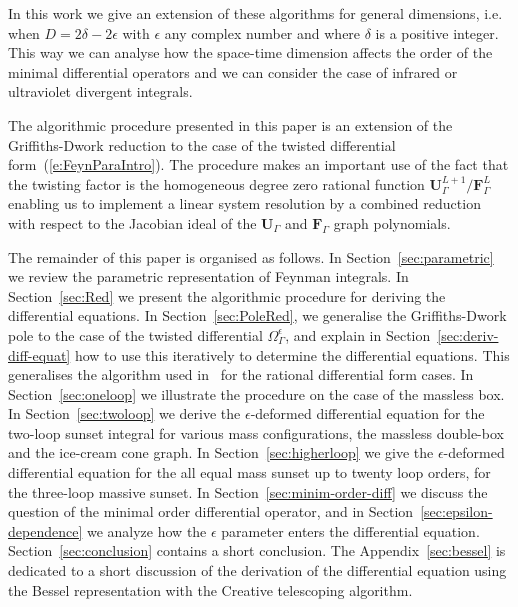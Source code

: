 \documentclass[a4paper,12pt]{article}
\newcommand\lNote[1]{
	\todo[backgroundcolor=red!20!white,fancyline,
	bordercolor=white]{ LDLC:  #1}}
\numberwithin{equation}{section}
\numberwithin{figure}{section}
\begin{document}
In this work we give an extension of these algorithms for
general dimensions, i.e. when $D=2 \delta -2\epsilon$ with $\epsilon$ any
complex number and where $\delta$ is a positive integer.  This way we
can analyse how the space-time dimension affects the order of the
minimal differential operators and we can consider the case of infrared
or ultraviolet divergent integrals.

The algorithmic procedure presented in this paper is an extension of
the Griffiths-Dwork reduction to the case of the twisted differential
form~(\ref{e:FeynParaIntro}).  The procedure makes an important use of
the fact that the twisting factor is the homogeneous degree zero
rational function $\textbf{U}_\Gamma^{L+1}/\textbf{F}_\Gamma^L$
enabling us to implement a linear system resolution by a combined
reduction with respect to the Jacobian ideal of the
$\textbf{U}_\Gamma$ and $\textbf{F}_\Gamma$ graph polynomials.

The remainder of this paper is organised as follows. 
In Section~\ref{sec:parametric} we review the parametric
representation of Feynman integrals. In Section~\ref{sec:Red} we
present the algorithmic procedure for deriving the differential
equations. In Section~\ref{sec:PoleRed},  we generalise the
Griffiths-Dwork pole to the case of the twisted differential
$\Omega_\Gamma^\epsilon$, and explain in
Section~\ref{sec:deriv-diff-equat} how to use this iteratively to
determine the differential equations. This generalises the algorithm
used in~\cite{Lairez:2022zkj} for the rational differential form cases.\lNote{rational case} In Section~\ref{sec:oneloop} we
illustrate the procedure on the case of the massless box. In
Section~\ref{sec:twoloop} we derive the $\epsilon$-deformed
differential equation for the two-loop sunset integral for various
mass configurations, the massless double-box and the ice-cream cone
graph. In Section~\ref{sec:higherloop} we give the $\epsilon$-deformed
differential
equation for the all equal mass sunset up to twenty loop orders, for
the three-loop massive sunset. In Section~\ref{sec:minim-order-diff}
we discuss the question of the minimal order differential operator,
and in Section~\ref{sec:epsilon-dependence} we analyze how the
$\epsilon$ parameter enters the differential
equation. Section~\ref{sec:conclusion} contains a short
conclusion. The Appendix~\ref{sec:bessel} is dedicated to a short
discussion of the derivation of the differential equation using the
Bessel representation with the Creative telescoping algorithm.

\end{document}
